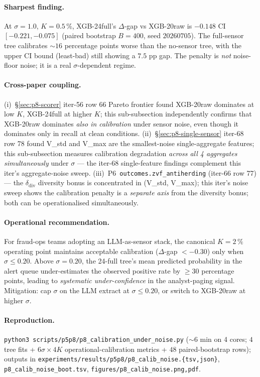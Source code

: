 \paragraph{Sharpest finding.}
At $\sigma{=}1.0$, $K{=}0.5\,\%$, XGB-24full's $\Delta$-gap vs
XGB-20raw is $\mathbf{-0.148}$ CI $[-0.221, -0.075]$ (paired
bootstrap $B{=}400$, seed $20260705$). The full-sensor tree
calibrates $\sim 16$ percentage points worse than the no-sensor tree,
with the upper CI bound (least-bad) still showing a $7.5$ pp gap.
The penalty is \emph{not} noise-floor noise; it is a real
$\sigma$-dependent regime.

\paragraph{Cross-paper coupling.}
(i)~\S\ref{sec:p8-scorer} iter-56 row 66 Pareto frontier found
XGB-20raw dominates at low $K$, XGB-24full at higher $K$; this
sub-subsection independently confirms that XGB-20raw dominates
\emph{also in calibration} under sensor noise, even though it
dominates only in recall at clean conditions. (ii)~\S\ref{sec:p8-single-sensor}
iter-68 row 78 found V\_std and V\_max are the smallest-noise
single-aggregate features; this sub-subsection measures
calibration degradation \emph{across all 4 aggregates simultaneously}
under $\sigma$ — the iter-68 single-feature findings complement
this iter's aggregate-noise sweep. (iii)~P6~\texttt{outcomes.zvf\_antiherding}
(iter-66 row 77) — the $\delta_{\mathrm{div}}$ diversity bonus is
concentrated in (V\_std, V\_max); this iter's noise sweep shows
the calibration penalty is a \emph{separate axis} from the diversity
bonus; both can be operationalised simultaneously.

\paragraph{Operational recommendation.}
For fraud-ops teams adopting an LLM-as-sensor stack, the canonical
$K{=}2\,\%$ operating point maintains acceptable calibration
($\Delta$-gap $< -0.30$) only when $\sigma \leq 0.20$. Above
$\sigma{=}0.20$, the 24-full tree's mean predicted probability in the
alert queue under-estimates the observed positive rate by
$\geq 30$ percentage points, leading to \emph{systematic
under-confidence} in the analyst-paging signal. Mitigation: cap
$\sigma$ on the LLM extract at $\sigma \leq 0.20$, or switch to
XGB-20raw at higher $\sigma$.

\paragraph{Reproduction.}
\texttt{python3 scripts/p5p8/p8\_calibration\_under\_noise.py}
($\sim 6$ min on 4 cores; $4$ tree fits + $6 \sigma \times 4 K$
operational-calibration metrics + $48$ paired-bootstrap rows);
outputs in
\texttt{experiments/results/p5p8/p8\_calib\_noise.\{tsv,json\}},
\texttt{p8\_calib\_noise\_boot.tsv},
\texttt{figures/p8\_calib\_noise.{png,pdf}}.

